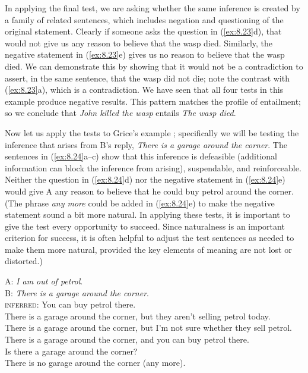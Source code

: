 In applying the final test, we are asking whether the same inference is created by a family of related sentences, which includes negation and questioning of the original statement. Clearly if someone asks the question in (\ref{ex:8.23}d), that would not give us any reason to believe that the wasp died. Similarly, the negative statement in (\ref{ex:8.23}e) gives us no reason to believe that the wasp died. We can demonstrate this by showing that it would not be a contradiction to assert, in the same sentence, that the wasp did not die; note the contrast with (\ref{ex:8.23}a), which is a contradiction. We have seen that all four tests in this example produce negative results. This pattern matches the profile of entailment; so we conclude that \textit{John killed the wasp} entails \textit{The wasp died}.



Now let us apply the tests to Grice’s example ; specifically we will be testing the inference that arises from B’s reply, \textit{There is a garage around the corner}. The sentences in (\ref{ex:8.24}a--c) show that this inference is defeasible (additional information can block the inference from arising), suspendable, and reinforceable. Neither the question in (\ref{ex:8.24}d) nor the negative statement in (\ref{ex:8.24}e) would give A any reason to believe that he could buy petrol around the corner. (The phrase \textit{any more} could be added in (\ref{ex:8.24}e) to make the negative statement sound a bit more natural. In applying these tests, it is important to give the test every opportunity to succeed. Since naturalness is an important criterion for success, it is often helpful to adjust the test sentences as needed to make them more natural, provided the key elements of meaning are not lost or distorted.)


\begin{stylepoints} \label{ex:8.24}
A: \textit{I am out of petrol}.\\
B: \textit{There is a garage around the corner}.\\
\textsc{inferred}: You can buy petrol there.\\
\ea There is a garage around the corner, but they aren’t selling petrol today.\\
\ex There is a garage around the corner, but I’m not sure whether they sell petrol.\\
\ex There is a garage around the corner, and you can buy petrol there.\\
\ex Is there a garage around the corner?\\
\ex There is no garage around the corner (any more).
                       \z
\end{stylepoints}


